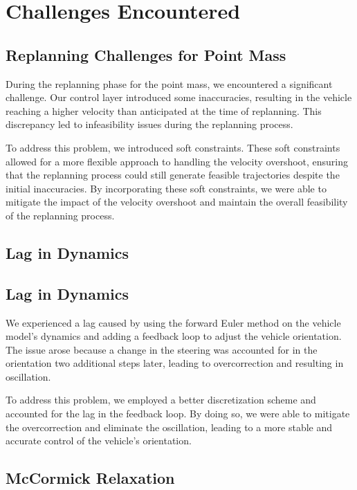 \section{Challenges Encountered}

\subsection{Replanning Challenges for Point Mass}

During the replanning phase for the point mass, we encountered a significant challenge.
Our control layer introduced some inaccuracies, resulting in the vehicle reaching a higher velocity than anticipated at the time of replanning.
This discrepancy led to infeasibility issues during the replanning process.

To address this problem, we introduced soft constraints.
These soft constraints allowed for a more flexible approach to handling the velocity overshoot, ensuring that the replanning process could still
generate feasible trajectories despite the initial inaccuracies.
By incorporating these soft constraints, we were able to mitigate the impact of the velocity overshoot and maintain the overall feasibility of the
replanning process.

\subsection{Lag in Dynamics}

\subsection{Lag in Dynamics}

We experienced a lag caused by using the forward Euler method on the vehicle model's dynamics and adding a feedback loop to adjust the vehicle
orientation.
The issue arose because a change in the steering was accounted for in the orientation two additional steps later, leading to overcorrection and
resulting in oscillation.

To address this problem, we employed a better discretization scheme and accounted for the lag in the feedback loop.
By doing so, we were able to mitigate the overcorrection and eliminate the oscillation, leading to a more stable and accurate control of the
vehicle's orientation.

\subsection{McCormick Relaxation}

